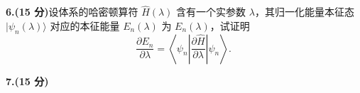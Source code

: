 \textbf{6.(15 分)}设体系的哈密顿算符 $\hat{H}(\lambda)$ 含有一个实参数 $\lambda$，其归一化能量本征态 $|\psi_n(\lambda)\rangle$ 对应的本征能量 $E_n(\lambda)$ 为 $E_n(\lambda)$，试证明
\[
\frac{\partial E_n}{\partial \lambda} = \left\langle \psi_n \left| \frac{\partial \hat{H}}{\partial \lambda} \right| \psi_n \right\rangle.~
\]

\textbf{7.(15 分)}